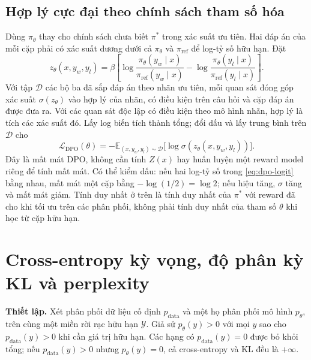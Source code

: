 \documentclass[11pt,a4paper]{article}
\newcommand{\E}{\mathbb{E}}
\newcommand{\pref}{\pi_{\mathrm{ref}}}
\newcommand{\pdata}{p_{\mathrm{data}}}
\begin{document}
\subsection*{Hợp lý cực đại theo chính sách tham số hóa}
Dùng $\pi_\theta$ thay cho chính sách chưa biết $\pi^*$ trong xác suất ưu tiên. Hai đáp án của mỗi cặp phải có xác suất dương dưới cả $\pi_\theta$ và $\pref$ để log-tỷ số hữu hạn. Đặt
\begin{equation}
  z_\theta(x,y_w,y_l)
   =\beta\left[
      \log\frac{\pi_\theta(y_w\mid x)}{\pref(y_w\mid x)}
      -\log\frac{\pi_\theta(y_l\mid x)}{\pref(y_l\mid x)}
   \right].
  \label{eq:dpo-logit}
\end{equation}
Với tập $\mathcal D$ các bộ ba đã sắp đáp án theo nhãn ưu tiên, mỗi quan sát đóng góp xác suất $\sigma(z_\theta)$ vào hợp lý của nhãn, có điều kiện trên câu hỏi và cặp đáp án được đưa ra. Với các quan sát độc lập có điều kiện theo mô hình nhãn, hợp lý là tích các xác suất đó. Lấy log biến tích thành tổng; đổi dấu và lấy trung bình trên $\mathcal D$ cho
\begin{equation}
  \boxed{\mathcal L_{\mathrm{DPO}}(\theta)
    =-\E_{(x,y_w,y_l)\sim\mathcal D}\bigl[\log\sigma(z_\theta(x,y_w,y_l))\bigr].}
  \label{eq:dpo-loss}
\end{equation}
Đây là mất mát DPO, không cần tính $Z(x)$ hay huấn luyện một reward model riêng để tính mất mát. Có thể kiểm dấu: nếu hai log-tỷ số trong \eqref{eq:dpo-logit} bằng nhau, mất mát một cặp bằng $-\log(1/2)=\log 2$; nếu hiệu tăng, $\sigma$ tăng và mất mát giảm. Tính duy nhất ở trên là tính duy nhất của $\pi^*$ với reward đã cho khi tối ưu trên các phân phối, không phải tính duy nhất của tham số $\theta$ khi học từ cặp hữu hạn.

\section{Cross-entropy kỳ vọng, độ phân kỳ KL và perplexity}
\label{sec:ppl}
\textbf{Thiết lập.} Xét phân phối dữ liệu cố định $\pdata$ và một họ phân phối mô hình $p_\theta$, trên cùng một miền rời rạc hữu hạn $\mathcal Y$. Giả sử $p_\theta(y)>0$ với mọi $y$ sao cho $\pdata(y)>0$ khi cần giá trị hữu hạn. Các hạng có $\pdata(y)=0$ được bỏ khỏi tổng; nếu $\pdata(y)>0$ nhưng $p_\theta(y)=0$, cả cross-entropy và KL đều là $+\infty$.
\end{document}

